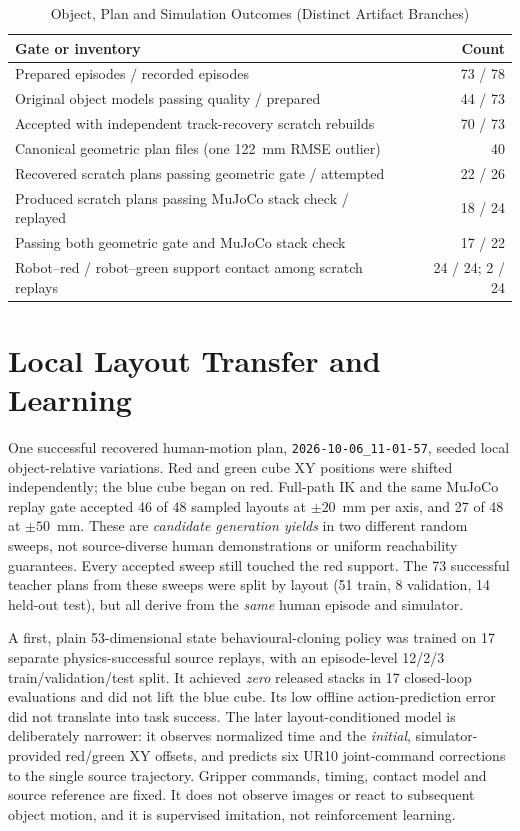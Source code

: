 \begin{table}[htbp]
\caption{Object, Plan and Simulation Outcomes (Distinct Artifact Branches)}
\label{tab:stage-yield}
\centering\small
\begin{tabular}{p{80mm}r}
\toprule
Gate or inventory & Count \\
\midrule
Prepared episodes / recorded episodes & 73 / 78 \\
Original object models passing quality / prepared & 44 / 73 \\
Accepted with independent track-recovery scratch rebuilds & 70 / 73 \\
Canonical geometric plan files (one 122~mm RMSE outlier) & 40 \\
Recovered scratch plans passing geometric gate / attempted & 22 / 26 \\
Produced scratch plans passing MuJoCo stack check / replayed & 18 / 24 \\
Passing both geometric gate and MuJoCo stack check & 17 / 22 \\
Robot--red / robot--green support contact among scratch replays & 24 / 24; 2 / 24 \\
\bottomrule
\end{tabular}
\end{table}

\section{Local Layout Transfer and Learning}
\label{sec:res-policy}

One successful recovered human-motion plan,
\texttt{2026-10-06\_11-01-57}, seeded local object-relative variations. Red
and green cube XY positions were shifted independently; the blue cube began
on red. Full-path IK and the same MuJoCo replay gate accepted 46 of 48
sampled layouts at $\pm20$~mm per axis, and 27 of 48 at $\pm50$~mm. These
are \emph{candidate generation yields} in two different random sweeps, not
source-diverse human demonstrations or uniform reachability guarantees.
Every accepted sweep still touched the red support. The 73 successful
teacher plans from these sweeps were split by layout (51 train, 8 validation,
14 held-out test), but all derive from the \emph{same} human episode and
simulator.

A first, plain 53-dimensional state behavioural-cloning policy was trained
on 17 separate physics-successful source replays, with an episode-level
12/2/3 train/validation/test split. It achieved \emph{zero} released stacks
in 17 closed-loop evaluations and did not lift the blue cube. Its low
offline action-prediction error did not translate into task success.
The later layout-conditioned model is deliberately narrower: it observes
normalized time and the \emph{initial}, simulator-provided red/green XY
offsets, and predicts six UR10 joint-command corrections to the single
source trajectory. Gripper commands, timing, contact model and source
reference are fixed. It does not observe images or react to subsequent
object motion, and it is supervised imitation, not reinforcement learning.

